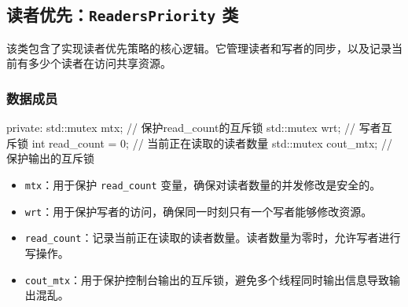 \subsection{读者优先：\texttt{ReadersPriority} 类}

该类包含了实现读者优先策略的核心逻辑。它管理读者和写者的同步，以及记录当前有多少个读者在访问共享资源。

\subsubsection{数据成员}
\begin{cppcode}
private:
    std::mutex mtx; // 保护read_count的互斥锁
    std::mutex wrt; // 写者互斥锁
    int read_count = 0;  // 当前正在读取的读者数量
    std::mutex cout_mtx; // 保护输出的互斥锁
\end{cppcode}
\begin{itemize}
    \item \texttt{mtx}：用于保护 \texttt{read\_count} 变量，确保对读者数量的并发修改是安全的。
	\item \texttt{wrt}：用于保护写者的访问，确保同一时刻只有一个写者能够修改资源。
	\item \texttt{read\_count}：记录当前正在读取的读者数量。读者数量为零时，允许写者进行写操作。
	\item \texttt{cout\_mtx}：用于保护控制台输出的互斥锁，避免多个线程同时输出信息导致输出混乱。
\end{itemize}

